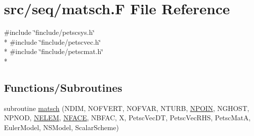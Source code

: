 \hypertarget{seq_2matsch_8_f}{\section{src/seq/matsch.F File Reference}
\label{seq_2matsch_8_f}
}
{\ttfamily \#include \char`\"{}finclude/petscsys.\-h\char`\"{}}\\*
{\ttfamily \#include \char`\"{}finclude/petscvec.\-h\char`\"{}}\\*
{\ttfamily \#include \char`\"{}finclude/petscmat.\-h\char`\"{}}\\*
\subsection*{Functions/\-Subroutines}
\begin{DoxyCompactItemize}
\item 
subroutine \hyperlink{seq_2matsch_8_f_a7896ab44e38f75125db87bccac7d273d}{matsch} (N\-D\-I\-M, N\-O\-F\-V\-E\-R\-T, N\-O\-F\-V\-A\-R, N\-T\-U\-R\-B, \hyperlink{mesh_8com_ae28c1572321efcd8715b974d87d20c58}{N\-P\-O\-I\-N}, N\-G\-H\-O\-S\-T, N\-P\-N\-O\-D, \hyperlink{mesh_8com_aee5e75b79d0e815c0603cfbccc618957}{N\-E\-L\-E\-M}, \hyperlink{mesh_8com_a78142d59d4cbb9fedbede16187658dd3}{N\-F\-A\-C\-E}, N\-B\-F\-A\-C, X, Petsc\-Vec\-D\-T, Petsc\-Vec\-R\-H\-S, Petsc\-Mat\-A, Euler\-Model, N\-S\-Model, Scalar\-Scheme)
\end{DoxyCompactItemize}


